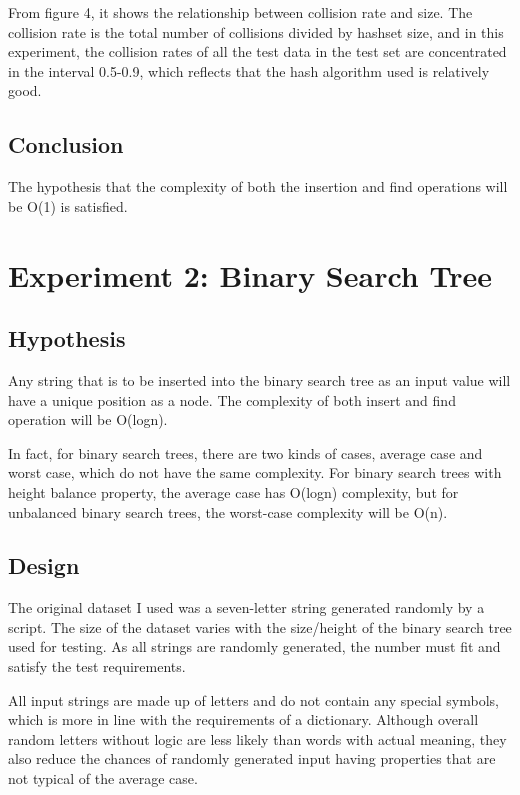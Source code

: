 \documentclass[a4]{article}
\begin{document}
From figure 4, it shows the relationship between collision rate and size. The collision rate is the total number of collisions divided by hashset size, and in this experiment, the collision rates of all the test data in the test set are concentrated in the interval 0.5-0.9, which reflects that the hash algorithm used is relatively good.

\subsection{Conclusion}
The hypothesis that the complexity of both the insertion and find operations will be O(1) is satisfied.

\newpage
\section{Experiment 2: Binary Search Tree}

\subsection{Hypothesis}
Any string that is to be inserted into the binary search tree as an input value will have a unique position as a node. The complexity of both insert and find operation will be O(logn).

In fact, for binary search trees, there are two kinds of cases, average case and worst case, which do not have the same complexity. For binary search trees with height balance property, the average case has O(logn) complexity, but for unbalanced binary search trees, the worst-case complexity will be O(n).

\subsection{Design}
The original dataset I used was a seven-letter string generated randomly by a script. The size of the dataset varies with the size/height of the binary search tree used for testing. As all strings are randomly generated, the number must fit and satisfy the test requirements.

All input strings are made up of letters and do not contain any special symbols, which is more in line with the requirements of a dictionary. Although overall random letters without logic are less likely than words with actual meaning, they also reduce the chances of randomly generated input having properties that are not typical of the average case.
\end{document}
